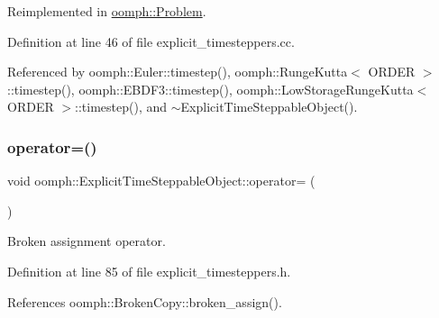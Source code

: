 Reimplemented in \hyperlink{classoomph_1_1Problem_a2d456362f4408556e879871ae34e57f1}{oomph\+::\+Problem}.



Definition at line 46 of file explicit\+\_\+timesteppers.\+cc.



Referenced by oomph\+::\+Euler\+::timestep(), oomph\+::\+Runge\+Kutta$<$ O\+R\+D\+E\+R $>$\+::timestep(), oomph\+::\+E\+B\+D\+F3\+::timestep(), oomph\+::\+Low\+Storage\+Runge\+Kutta$<$ O\+R\+D\+E\+R $>$\+::timestep(), and $\sim$\+Explicit\+Time\+Steppable\+Object().

\mbox{\label{classoomph_1_1ExplicitTimeSteppableObject_a10d44a6010c7ee70b7d1fd14fad864dc}} 
\subsubsection{\texorpdfstring{operator=()}{operator=()}}
{\footnotesize\ttfamily void oomph\+::\+Explicit\+Time\+Steppable\+Object\+::operator= (\begin{DoxyParamCaption}\item[{const \hyperlink{classoomph_1_1ExplicitTimeSteppableObject}{Explicit\+Time\+Steppable\+Object} \&}]{ }\end{DoxyParamCaption})\hspace{0.3cm}{\ttfamily [inline]}}



Broken assignment operator. 



Definition at line 85 of file explicit\+\_\+timesteppers.\+h.



References oomph\+::\+Broken\+Copy\+::broken\+\_\+assign().

\mbox{\label{classoomph_1_1ExplicitTimeSteppableObject_a76a8d64f2d6aa8de955b44c86e9b3ecb}} 
